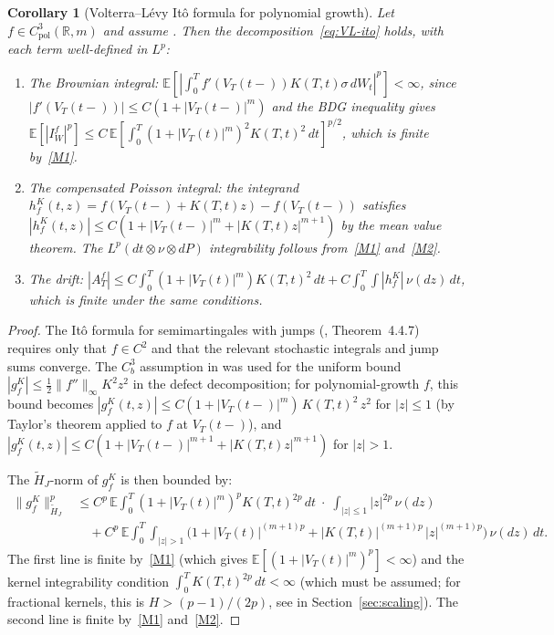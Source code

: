 \documentclass[11pt,a4paper]{article}
\theoremstyle{plain}
\newtheorem{corollary}[theorem]{Corollary}
\theoremstyle{definition}
\theoremstyle{remark}
\newcommand{\E}{\mathbb{E}}
\newcommand{\R}{\mathbb{R}}
\begin{document}
\begin{corollary}[Volterra--L\'evy It\^o formula for polynomial
growth]\label{cor:VL-ito-poly}
Let $f \in C_{\mathrm{pol}}^3(\R,m)$ and assume
.  Then the decomposition~\eqref{eq:VL-ito}
holds, with each term well-defined in $L^p$:
\begin{enumerate}[label=(\alph*)]
\item The Brownian integral: $\E[|\int_0^T
  f'(V_T(t\!-\!))K(T,t)\sigma\,dW_t|^p] < \infty$, since
  $|f'(V_T(t\!-\!))| \leq C(1+|V_T(t\!-\!)|^m)$ and the
  BDG inequality gives $\E[|I_W^f|^p] \leq
  C\,\E[\int_0^T(1+|V_T(t)|^m)^2 K(T,t)^2\,dt]^{p/2}$,
  which is finite by~\ref{M1}.
\item The compensated Poisson integral: the integrand
  $h_f^K(t,z) = f(V_T(t\!-\!) + K(T,t)z) - f(V_T(t\!-\!))$
  satisfies $|h_f^K(t,z)| \leq
  C(1 + |V_T(t\!-\!)|^m + |K(T,t)z|^{m+1})$ by the
  mean value theorem.  The $L^p(dt \otimes \nu \otimes dP)$
  integrability follows from~\ref{M1} and~\ref{M2}.
\item The drift: $|A_T^f| \leq C\int_0^T(1+|V_T(t)|^m)
  K(T,t)^2\,dt + C\int_0^T\!\int|h_f^K|\,\nu(dz)\,dt$,
  which is finite under the same conditions.
\end{enumerate}
\end{corollary}

\begin{proof}
The It\^o formula for semimartingales with jumps
(\cite{Applebaum2009}, Theorem~4.4.7) requires only that
$f \in C^2$ and that the relevant stochastic integrals
and jump sums converge.  The $C_b^3$ assumption in
 was used for the uniform bound
$|g_f^K| \leq \frac{1}{2}\|f''\|_\infty K^2 z^2$ in the
defect decomposition; for polynomial-growth $f$, this
bound becomes $|g_f^K(t,z)| \leq
C(1+|V_T(t\!-\!)|^m)\,K(T,t)^2\,z^2$ for $|z| \leq 1$
(by Taylor's theorem applied to $f$ at $V_T(t\!-\!)$),
and $|g_f^K(t,z)| \leq C(1+|V_T(t\!-\!)|^{m+1}
+ |K(T,t)z|^{m+1})$ for $|z| > 1$.

The $\widetilde{H}_J$-norm of $g_f^K$ is then bounded by:
\begin{align*}
  \|g_f^K\|_{\widetilde{H}_J}^p
  &\leq C^p\,\E\!\int_0^T\!(1+|V_T(t)|^m)^p K(T,t)^{2p}\,dt
  \;\cdot\;\int_{|z|\leq 1}|z|^{2p}\,\nu(dz)\\
  &\quad+ C^p\,\E\!\int_0^T\!\!\int_{|z|>1}\!
  \bigl(1+|V_T(t)|^{(m+1)p}
  + |K(T,t)|^{(m+1)p}\,|z|^{(m+1)p}\bigr)\,\nu(dz)\,dt.
\end{align*}
The first line is finite by~\ref{M1} (which gives
$\E[(1+|V_T(t)|^m)^p] < \infty$) and the kernel integrability
condition $\int_0^T K(T,t)^{2p}\,dt < \infty$ (which must be
assumed; for fractional kernels, this is $H > (p-1)/(2p)$,
see  in Section~\ref{sec:scaling}).
The second line is finite by~\ref{M1} and~\ref{M2}.
\end{proof}
\end{document}
